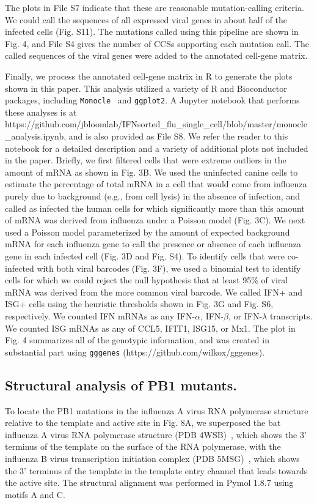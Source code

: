 \documentclass[]{article}
\begin{document}
The plots in File S7 indicate that these are reasonable mutation-calling criteria.
We could call the sequences of all expressed viral genes in about half of the infected cells (Fig. S11).
The mutations called using this pipeline are shown in Fig. 4, and File S4 gives the number of CCSs supporting each mutation call.
The called sequences of the viral genes were added to the annotated cell-gene matrix.

Finally, we process the annotated cell-gene matrix in R to generate the plots shown in this paper.
This analysis utilized a variety of R and Bioconductor~\cite{huber2015orchestrating} packages, including \texttt{Monocle}~\cite{qiu2017reversed, trapnell2014dynamics} and \texttt{ggplot2}.
A Jupyter notebook that performs these analyses is at https://github.com/jbloomlab/IFNsorted\_flu\_single\_cell/blob/master/monocle\_analysis.ipynb, and is also provided as File S8.
We refer the reader to this notebook for a detailed description and a variety of additional plots not included in the paper.
Briefly, we first filtered cells that were extreme outliers in the amount of mRNA as shown in Fig. 3B.
We used the uninfected canine cells to estimate the percentage of total mRNA in a cell that would come from influenza purely due to background (e.g., from cell lysis) in the absence of infection, and called as infected the human cells for which significantly more than this amount of mRNA was derived from influenza under a Poisson model (Fig. 3C).
We next used a Poisson model parameterized by the amount of expected background mRNA for each influenza gene to call the presence or absence of each influenza gene in each infected cell (Fig. 3D and Fig. S4). 
To identify cells that were co-infected with both viral barcodes (Fig. 3F), we used a binomial test to identify cells for which we could reject the null hypothesis that at least 95\% of viral mRNA was derived from the more common viral barcode.
We called IFN+ and ISG+ cells using the heuristic thresholds shown in Fig. 3G and Fig. S6, respectively.
We counted IFN mRNAs as any IFN-$\alpha$, IFN-$\beta$, or IFN-$\lambda$ transcripts.
We counted ISG mRNAs as any of CCL5, IFIT1, ISG15, or Mx1.
The plot in Fig. 4 summarizes all of the genotypic information, and was created in substantial part using \texttt{gggenes} (https://github.com/wilkox/gggenes).

\subsection*{Structural analysis of PB1 mutants.}
To locate the PB1 mutations in the influenza A virus RNA polymerase structure relative to the template and active site in Fig. 8A, we superposed the bat influenza A virus RNA polymerase structure (PDB 4WSB)~\cite{reich2014structural}, which shows the 3' terminus of the template on the surface of the RNA polymerase, with the influenza B virus transcription initiation complex (PDB 5MSG)~\cite{reich2017vitro}, which shows the 3' terminus of the template in the template entry channel that leads towards the active site.
The structural alignment was performed in Pymol 1.8.7 using motifs A and C.
\end{document}
